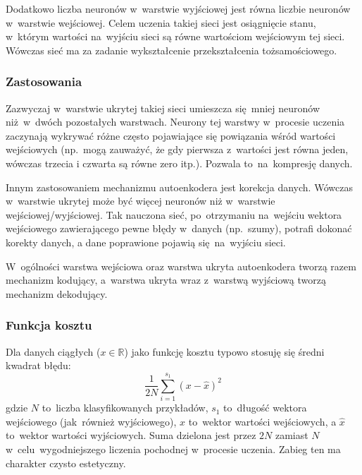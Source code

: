 Dodatkowo liczba neuronów w~warstwie wyjściowej jest równa liczbie neuronów w~warstwie wejściowej.
Celem uczenia takiej sieci jest osiągnięcie stanu, w~którym wartości na~wyjściu sieci są równe
wartościom wejściowym tej sieci. Wówczas sieć ma za zadanie wykształcenie przekształcenia tożsamościowego.

\subsubsection{Zastosowania}
Zazwyczaj w~warstwie ukrytej takiej sieci umieszcza się~mniej neuronów niż~w~dwóch pozostałych warstwach.
Neurony tej warstwy w~procesie uczenia zaczynają wykrywać różne często pojawiające się powiązania
wśród wartości wejściowych (np.~mogą zauważyć, że gdy pierwsza z~wartości jest równa jeden,
wówczas trzecia i czwarta są równe zero itp.).
Pozwala to~na~kompresję danych.

Innym zastosowaniem mechanizmu autoenkodera jest korekcja danych. Wówczas w~warstwie ukrytej
może być więcej neuronów niż w~warstwie wejściowej/wyjściowej. Tak nauczona sieć, po~otrzymaniu na~wejściu
wektora wejściowego zawierającego pewne błędy w~danych (np.~szumy), potrafi dokonać korekty danych,
a dane poprawione pojawią się~na~wyjściu sieci.

W~ogólności warstwa wejściowa oraz warstwa ukryta autoenkodera tworzą razem mechanizm kodujący, a~warstwa ukryta wraz
z~warstwą wyjściową tworzą mechanizm dekodujący.

\subsubsection{Funkcja kosztu}
Dla danych ciągłych ($x\in\mathbb{R}$) jako funkcję kosztu typowo stosuję się średni kwadrat błędu:
\begin{equation*}
\frac{1}{2N}\sum\limits_{i=1}^{s_1}(x-\hat{x})^2
\end{equation*}
gdzie $N$ to~liczba klasyfikowanych przykładów, $s_1$ to~długość wektora wejściowego (jak~również wyjściowego),
$x$ to~wektor wartości wejściowych, a $\hat{x}$ to~wektor wartości wyjściowych. Suma dzielona jest przez $2N$ zamiast
$N$ w~celu~wygodniejszego liczenia pochodnej w~procesie uczenia. Zabieg ten ma charakter czysto estetyczny.

